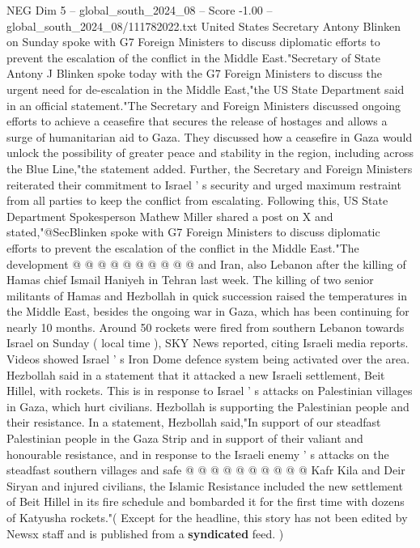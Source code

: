 \begin{textsample}{NEG Dim 5 – global\_south\_2024\_08 – Score -1.00 – global\_south\_2024\_08/111782022.txt}  \label{ex:f5_neg_123}
United States Secretary Antony Blinken on Sunday spoke with G7 Foreign Ministers to discuss diplomatic efforts to prevent the escalation of the conflict in the Middle East."Secretary of State Antony J Blinken spoke today with the G7 Foreign Ministers to discuss the urgent need for de-escalation in the Middle East,"the US State Department said in an official statement."The Secretary and Foreign Ministers discussed ongoing efforts to achieve a ceasefire that secures the release of hostages and allows a surge of humanitarian aid to Gaza.
They discussed how a ceasefire in Gaza would unlock the possibility of greater peace and stability in the region, including across the Blue Line,"the statement added.
Further, the Secretary and Foreign Ministers reiterated their commitment to Israel ' s security and urged maximum restraint from all parties to keep the conflict from escalating.
Following this, US State Department Spokesperson Mathew Miller shared a post on X and stated,"@SecBlinken spoke with G7 Foreign Ministers to discuss diplomatic efforts to prevent the escalation of the conflict in the Middle East."The development @ @ @ @ @ @ @ @ @ @ and Iran, also Lebanon after the killing of Hamas chief Ismail Haniyeh in Tehran last week.
The killing of two senior militants of Hamas and Hezbollah in quick succession raised the temperatures in the Middle East, besides the ongoing war in Gaza, which has been continuing for nearly 10 months.
Around 50 rockets were fired from southern Lebanon towards Israel on Sunday ( local time ), SKY News reported, citing Israeli media reports.
Videos showed Israel ' s Iron Dome defence system being activated over the area.
Hezbollah said in a statement that it attacked a new Israeli settlement, Beit Hillel, with rockets.
This is in response to Israel ' s attacks on Palestinian villages in Gaza, which hurt civilians.
Hezbollah is supporting the Palestinian people and their resistance.
In a statement, Hezbollah said,"In support of our steadfast Palestinian people in the Gaza Strip and in support of their valiant and honourable resistance, and in response to the Israeli enemy ' s attacks on the steadfast southern villages and safe @ @ @ @ @ @ @ @ @ @ Kafr Kila and Deir Siryan and injured civilians, the Islamic Resistance included the new settlement of Beit Hillel in its fire schedule and bombarded it for the first time with dozens of Katyusha rockets."( Except for the headline, this story has not been edited by Newsx staff and is published from a \textbf{syndicated} feed. )

\end{textsample}

